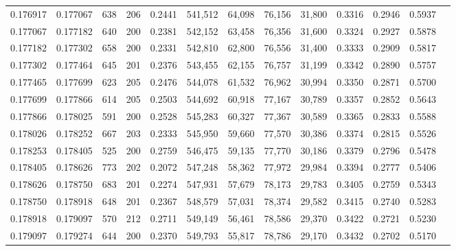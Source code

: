 \begin{tabular}{rrrrrrrrrrrrr}
0.176917 & 0.177067 &   638 & 206 &                                     0.2441 & 541,512 &  64,098 &  76,156 &  31,800 & 0.3316 & 0.2946 & 0.5937 \\
0.177067 & 0.177182 &   640 & 200 &                                     0.2381 & 542,152 &  63,458 &  76,356 &  31,600 & 0.3324 & 0.2927 & 0.5878 \\
0.177182 & 0.177302 &   658 & 200 &                                     0.2331 & 542,810 &  62,800 &  76,556 &  31,400 & 0.3333 & 0.2909 & 0.5817 \\
0.177302 & 0.177464 &   645 & 201 &                                     0.2376 & 543,455 &  62,155 &  76,757 &  31,199 & 0.3342 & 0.2890 & 0.5757 \\
0.177465 & 0.177699 &   623 & 205 &                                     0.2476 & 544,078 &  61,532 &  76,962 &  30,994 & 0.3350 & 0.2871 & 0.5700 \\
0.177699 & 0.177866 &   614 & 205 &                                     0.2503 & 544,692 &  60,918 &  77,167 &  30,789 & 0.3357 & 0.2852 & 0.5643 \\
0.177866 & 0.178025 &   591 & 200 &                                     0.2528 & 545,283 &  60,327 &  77,367 &  30,589 & 0.3365 & 0.2833 & 0.5588 \\
0.178026 & 0.178252 &   667 & 203 &                                     0.2333 & 545,950 &  59,660 &  77,570 &  30,386 & 0.3374 & 0.2815 & 0.5526 \\
0.178253 & 0.178405 &   525 & 200 &                                     0.2759 & 546,475 &  59,135 &  77,770 &  30,186 & 0.3379 & 0.2796 & 0.5478 \\
0.178405 & 0.178626 &   773 & 202 &                                     0.2072 & 547,248 &  58,362 &  77,972 &  29,984 & 0.3394 & 0.2777 & 0.5406 \\
0.178626 & 0.178750 &   683 & 201 &                                     0.2274 & 547,931 &  57,679 &  78,173 &  29,783 & 0.3405 & 0.2759 & 0.5343 \\
0.178750 & 0.178918 &   648 & 201 &                                     0.2367 & 548,579 &  57,031 &  78,374 &  29,582 & 0.3415 & 0.2740 & 0.5283 \\
0.178918 & 0.179097 &   570 & 212 &                                     0.2711 & 549,149 &  56,461 &  78,586 &  29,370 & 0.3422 & 0.2721 & 0.5230 \\
0.179097 & 0.179274 &   644 & 200 &                                     0.2370 & 549,793 &  55,817 &  78,786 &  29,170 & 0.3432 & 0.2702 & 0.5170 \\

\end{tabular}
